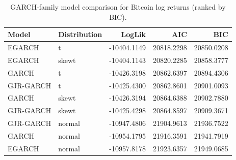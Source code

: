 \begin{table}
\caption{GARCH-family model comparison for Bitcoin log returns (ranked by BIC).}
\label{tab:garch_bitcoin}
\begin{tabular}{llrrr}
\toprule
Model & Distribution & LogLik & AIC & BIC \\
\midrule
EGARCH & t & -10404.1149 & 20818.2298 & 20850.0208 \\
EGARCH & skewt & -10404.1143 & 20820.2285 & 20858.3777 \\
GARCH & t & -10426.3198 & 20862.6397 & 20894.4306 \\
GJR-GARCH & t & -10425.4300 & 20862.8601 & 20901.0093 \\
GARCH & skewt & -10426.3194 & 20864.6388 & 20902.7880 \\
GJR-GARCH & skewt & -10425.4298 & 20864.8597 & 20909.3671 \\
GJR-GARCH & normal & -10947.4806 & 21904.9613 & 21936.7522 \\
GARCH & normal & -10954.1795 & 21916.3591 & 21941.7919 \\
EGARCH & normal & -10957.8178 & 21923.6357 & 21949.0685 \\
\bottomrule
\end{tabular}
\end{table}
